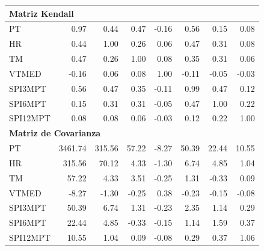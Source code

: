 \begin{table}[ht]
\begin{tabular}{lrrrrrrr}
\midrule
\multicolumn{8}{l}{\textbf{Matriz Kendall}} \\
\midrule
PT       & 0.97 & 0.44 & 0.47 & -0.16 & 0.56 & 0.15 & 0.08 \\
HR       & 0.44 & 1.00 & 0.26 & 0.06 & 0.47 & 0.31 & 0.08 \\
TM       & 0.47 & 0.26 & 1.00 & 0.08 & 0.35 & 0.31 & 0.06 \\
VTMED    & -0.16 & 0.06 & 0.08 & 1.00 & -0.11 & -0.05 & -0.03 \\
SPI3MPT  & 0.56 & 0.47 & 0.35 & -0.11 & 0.99 & 0.47 & 0.12 \\
SPI6MPT  & 0.15 & 0.31 & 0.31 & -0.05 & 0.47 & 1.00 & 0.22 \\
SPI12MPT & 0.08 & 0.08 & 0.06 & -0.03 & 0.12 & 0.22 & 1.00 \\
\midrule
\multicolumn{8}{l}{\textbf{Matriz de Covarianza}} \\
\midrule
PT       & 3461.74 & 315.56 & 57.22 & -8.27 & 50.39 & 22.44 & 10.55 \\
HR       & 315.56 & 70.12 & 4.33 & -1.30 & 6.74 & 4.85 & 1.04 \\
TM       & 57.22 & 4.33 & 3.51 & -0.25 & 1.31 & -0.33 & 0.09 \\
VTMED    & -8.27 & -1.30 & -0.25 & 0.38 & -0.23 & -0.15 & -0.08 \\
SPI3MPT  & 50.39 & 6.74 & 1.31 & -0.23 & 2.35 & 1.14 & 0.29 \\
SPI6MPT  & 22.44 & 4.85 & -0.33 & -0.15 & 1.14 & 1.59 & 0.37 \\
SPI12MPT & 10.55 & 1.04 & 0.09 & -0.08 & 0.29 & 0.37 & 1.06 \\
\bottomrule
\end{tabular}
\end{table}




